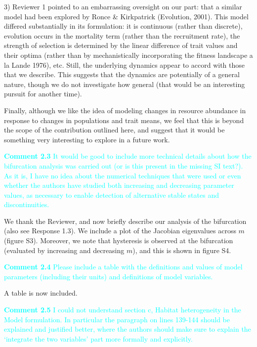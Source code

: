 \documentclass[ucm,12pt]{ucletter}
\newcounter{section}
\begin{document}
\begin{letter}
3) Reviewer 1 pointed to an embarrassing oversight on our part: that a similar model had been explored by Ronce \& Kirkpatrick (Evolution, 2001). This model differed substantially in its formulation: it is continuous (rather than discrete), evolution occurs in the mortality term (rather than the recruitment rate), the strength of selection is determined by the linear difference of trait values and their optima (rather than by mechanistically incorporating the fitness landscape a la Lande 1976), etc. Still, the underlying dynamics appear to accord with those that we describe. This suggests that the dynamics are potentially of a general nature, though we do not investigate how general (that would be an interesting pursuit for another time).

Finally, although we like the idea of modeling changes in resource abundance in response to changes in populations and trait means, we feel that this is beyond the scope of the contribution outlined here, and suggest that it would be something very interesting to explore in a future work.


\noindent \textcolor{cyan}{
{\bf Comment 2.3} It would be good to include more technical details about how the bifurcation analysis was carried out (or is this present in the missing SI text?). As it is, I have no idea about the numerical techniques that were used or even whether the authors have studied both increasing and decreasing parameter values, as necessary to enable detection of alternative stable states and discontinuities.
}

 We thank the Reviewer, and now briefly describe our analysis of the bifurcation (also see Response 1.3). We include a plot of the Jacobian eigenvalues across $m$ (figure S3). Moreover, we note that hysteresis is observed at the bifurcation (evaluated by increasing and decreasing $m$), and this is shown in figure S4.

\noindent \textcolor{cyan}{
{\bf Comment 2.4} Please include a table with the definitions and values of model parameters (including their units) and definitions of model variables.
}

 A table is now included. 

\noindent \textcolor{cyan}{
{\bf Comment 2.5} I could not understand section c, Habitat heterogeneity in the Model formulation. In particular the paragraph on lines 139-144 should be explained and justified better, where the authors should make sure to explain the ‘integrate the two variables’ part more formally and explicitly.
}


\end{letter}
\end{document}
